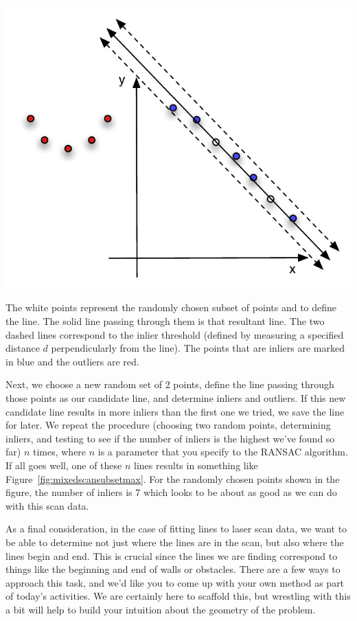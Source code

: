 \documentclass{tufte-handout}
\begin{document}
\begin{marginfigure}
\begin{center}
\includegraphics[width=\linewidth]{Figures/mixedscansubsetmax}
\end{center}
\caption{The white points represent the randomly chosen subset of points and to define the line.  The solid line passing through them is that resultant line.  The two dashed lines correspond to the inlier threshold (defined by measuring a specified distance $d$ perpendicularly from the line).  The points that are inliers are marked in blue and the outliers are red.\label{fig:mixedscansubsetmax}}
\end{marginfigure}

Next, we choose a new random set of 2 points, define the line passing through those points as our candidate line, and determine inliers and outliers.  If this new candidate line results in more inliers than the first one we tried, we save the line for later.  We repeat the procedure (choosing two random points, determining inliers, and testing to see if the number of inliers is the highest we've found so far) $n$ times, where $n$ is a parameter that you specify to the RANSAC algorithm.  If all goes well, one of these $n$ lines results in something like Figure~\ref{fig:mixedscansubsetmax}.  For the randomly chosen points shown in the figure, the number of inliers is 7 which looks to be about as good as we can do with this scan data.

As a final consideration, in the case of fitting lines to laser scan data, we want to be able to determine not just where the lines are in the scan, but also where the lines begin and end.  This is crucial since the lines we are finding correspond to things like the beginning and end of walls or obstacles.  There are a few ways to approach this task, and we'd like you to come up with your own method as part of today's activities.  We are certainly here to scaffold this, but wrestling with this a bit will help to build your intuition about the geometry of the problem.
\end{document}
